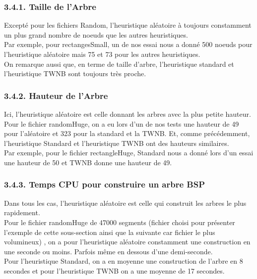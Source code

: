 \documentclass[a4paper,12pt]{report}	%
\begin{document}
    {\subsubsection*{3.4.1. Taille de l'Arbre}}
      Excepté pour les fichiers Random, l'heuristique aléatoire à toujours constamment un plus grand nombre de noeuds que les autres heuristiques.\\
\indent Par exemple, pour rectangesSmall, un de nos essai nous a donné 500 noeuds pour l'heuristique aléatoire mais 75 et 73 pour les autres heuristiques.\\
\indent On remarque aussi que, en terme de taille d'arbre, l'heuristique standard et l'heuristique TWNB sont toujours très proche.\\
    
    {\subsubsection*{3.4.2. Hauteur de l'Arbre}}
      Ici, l'heuristique aléatoire est celle donnant les arbres avec la plus petite hauteur. Pour le fichier randomHuge, on a eu lors d'un de nos tests une hauteur de 49 pour l'aléatoire et 323 pour la standard et la TWNB. Et, comme précédemment, l'heuristique Standard et l'heuristique TWNB ont des hauteurs similaires. \\
\indent Par exemple, pour le fichier rectangleHuge, Standard nous a donné lors d'un essai une hauteur de 50 et TWNB donne une hauteur de 49.\\
    
    {\subsubsection*{3.4.3. Temps CPU pour construire un arbre BSP}}
     Dans tous les cas, l'heuristique aléatoire est celle qui construit les arbres le plus rapidement. \\
\indent Pour le fichier randomHuge de 47000 segments (fichier choisi pour présenter l'exemple de cette sous-section ainsi que la suivante car fichier le plus volumineux) , on a pour l'heuristique aléatoire constamment une construction en une seconde ou moins. Parfois même en dessous d'une demi-seconde. \\
\indent Pour l'heuristique Standard, on a en moyenne une construction de l'arbre en 8 secondes et pour l'heuristique TWNB on a une moyenne de 17 secondes. \\
        
\end{document}

